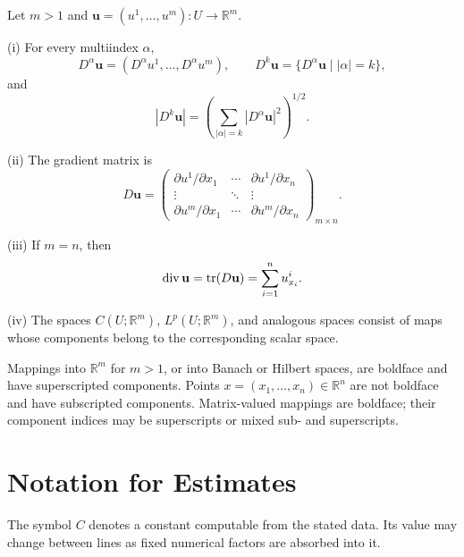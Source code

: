 \begin{definition}
\label{def:vector-valued-function-notation}

Let $m>1$ and $\mathbf u=(u^1,\ldots,u^m):U\to\mathbb R^m$.

(i) For every multiindex $\alpha$,
\[
D^\alpha\mathbf u=(D^\alpha u^1,\ldots,D^\alpha u^m),
\qquad
D^k\mathbf u=\{D^\alpha\mathbf u\mid |\alpha|=k\},
\]
and
\[
|D^k\mathbf u|
=\left(\sum_{|\alpha|=k}|D^\alpha\mathbf u|^2\right)^{1/2}.
\]

(ii) The gradient matrix is
\[
D\mathbf u=
\begin{pmatrix}
\partial u^1/\partial x_1&\cdots&\partial u^1/\partial x_n\\
\vdots&\ddots&\vdots\\
\partial u^m/\partial x_1&\cdots&\partial u^m/\partial x_n
\end{pmatrix}_{m\times n}.
\]

(iii) If $m=n$, then
\[
\operatorname{div}\mathbf u
=\operatorname{tr}(D\mathbf u)
=\sum_{i=1}^n u^i_{x_i}.
\]

(iv) The spaces $C(U;\mathbb R^m)$, $L^p(U;\mathbb R^m)$, and analogous spaces consist of maps whose components belong to the corresponding scalar space.
\end{definition}

\begin{remark}
\label{rem:boldface-convention-sub-superscripts}

Mappings into $\mathbb R^m$ for $m>1$, or into Banach or Hilbert spaces, are boldface and have superscripted components. Points $x=(x_1,\ldots,x_n)\in\mathbb R^n$ are not boldface and have subscripted components. Matrix-valued mappings are boldface; their component indices may be superscripts or mixed sub- and superscripts.
\end{remark}

\section{Notation for Estimates}
\label{sec:notation-for-estimates}

\begin{remark}[Constants]
\label{rem:constant-notation-convention}
The symbol $C$ denotes a constant computable from the stated data. Its value may change between lines as fixed numerical factors are absorbed into it.
\end{remark}

